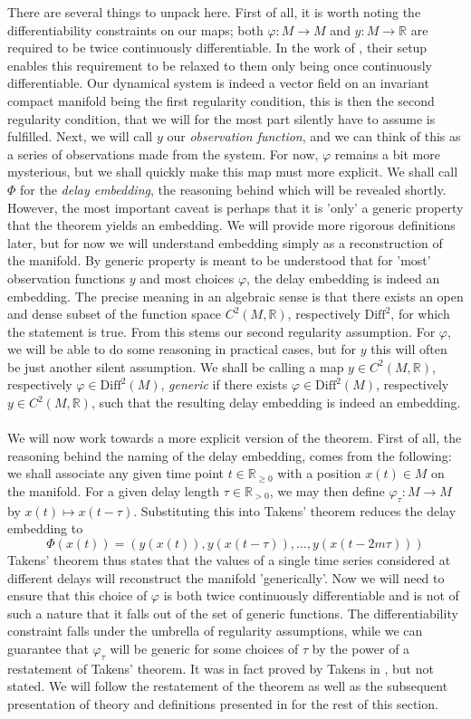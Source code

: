 \documentclass[11pt, a4paper]{memoir}
\theoremstyle{break}
\theoremstyle{break}
\theoremstyle{nonumberplain}
\newcommand{\mR}{\mathbb{R}}
\begin{document}
There are several things to unpack here. First of all, it is worth noting the differentiability constraints on our maps; both $\varphi: M\to M$ and $y:M\to\mR$ are required to be twice continuously differentiable. In the work of \cite{Sauer1991}, their setup enables this requirement to be relaxed to them only being once continuously differentiable. Our dynamical system is indeed a vector field on an invariant compact manifold being the first regularity condition, this is then the second regularity condition, that we will for the most part silently have to assume is fulfilled. Next, we will call $y$ our \textit{observation function}, and we can think of this as a series of observations made from the system. For now, $\varphi$ remains a bit more mysterious, but we shall quickly make this map must more explicit. We shall call $\Phi$ for the \textit{delay embedding}, the reasoning behind which will be revealed shortly. However, the most important caveat is perhaps that it is 'only' a generic property that the theorem yields an embedding. We will provide more rigorous definitions later, but for now we will understand embedding simply as a reconstruction of the manifold. By generic property is meant to be understood that for 'most' observation functions $y$ and most choices $\varphi$, the delay embedding is indeed an embedding. The precise meaning in an algebraic sense is that there exists an open and dense subset of the function space $C^2(M,\mR)$, respectively $\text{Diff}^2$, for which the statement is true. From this stems our second regularity assumption. For $\varphi$, we will be able to do some reasoning in practical cases, but for $y$ this will often be just another silent assumption. We shall be calling a map $y\in C^2(M,\mR)$, respectively $\varphi\in \text{Diff}^2(M)$, \textit{generic} if there exists $\varphi\in \text{Diff}^2(M)$, respectively $y\in C^2(M,\mR)$, such that the resulting delay embedding is indeed an embedding.\\\\
We will now work towards a more explicit version of the theorem. First of all, the reasoning behind the naming of the delay embedding, comes from the following: we shall associate any given time point $t\in \mR_{\geqslant 0}$ with a position $x(t)\in M$ on the manifold. For a given delay length $\tau\in \mR_{>0}$, we may then define $\varphi_\tau: M\to M$ by $x(t)\mapsto x(t-\tau)$. Substituting this into Takens' theorem reduces the delay embedding to
$$\Phi(x(t))=(y(x(t)),y(x(t-\tau)),\ldots,y(x(t-2m\tau)))$$
Takens' theorem thus states that the values of a single time series considered at different delays will reconstruct the manifold 'generically'. Now we will need to ensure that this choice of $\varphi$ is both twice continuously differentiable and is not of such a nature that it falls out of the set of generic functions. The differentiability constraint falls under the umbrella of regularity assumptions, while we can guarantee that $\varphi_\tau$ will be generic for some choices of $\tau$ by the power of a restatement of Takens' theorem. It was in fact proved by Takens in \cite{Takens}, but not stated. We will follow the restatement of the theorem as well as the subsequent presentation of theory and definitions presented in \cite{Huke} for the rest of this section.
\end{document}
